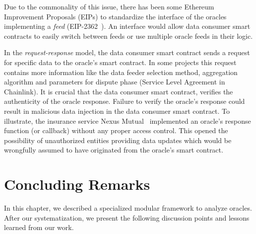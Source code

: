 Due to the commonality of this issue, there has been some Ethereum Improvement Proposals (EIPs) to standardize the interface of the oracles implementing a \textit{feed} (\eg EIP-2362~\cite{eip2362}). An interface would allow data consumer smart contracts to easily switch between feeds or use multiple oracle feeds in their logic. 

In the \textit{request-response} model, the data consumer smart contract sends a request for specific data to the oracle's smart contract. In some projects this request contains more information like the data feeder selection method, aggregation algorithm and parameters for dispute phase (\eg Service Level Agreement in Chainlink). It is crucial that the data consumer smart contract, verifies the authenticity of the oracle response. Failure to verify the oracle's response could result in malicious data injection in the data consumer smart contract. To illustrate, the insurance service Nexus Mutual~\cite{nexusmutualbug} implemented an oracle's response function (or callback) without any proper access control. This opened the possibility of unauthorized entities providing data updates which would be wrongfully assumed to have originated from the oracle's smart contract. 



\section{Concluding Remarks}
In this chapter, we described a specialized modular framework to analyze oracles. After our systematization, we present the following discussion points and lessons learned from our work. 

